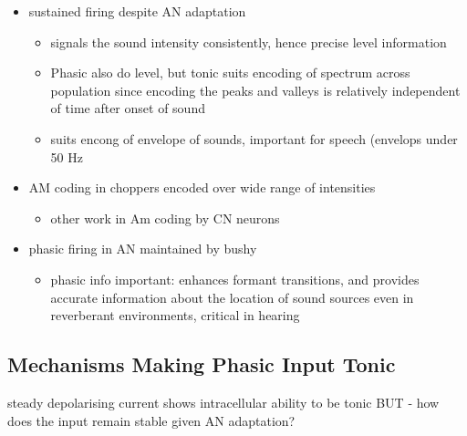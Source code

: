\begin{itemize}
\item sustained firing despite AN adaptation
\begin{itemize}
\item signals the sound intensity consistently, hence precise level information
\item Phasic also do level, but tonic suits encoding of spectrum across population since encoding the peaks and valleys is relatively independent of time after onset of sound \citep{BlackburnSachs:1990,May:2003,MayPrellEtAl:1998,MaySachs:1998}
\item suits encong of envelope of sounds, important for speech (envelops under 50 Hz \citep{ShannonZengEtAl:1995}
\end{itemize}
\item AM coding in choppers encoded over wide range of intensities \citep{RhodeGreenberg:1994,FrisinaSmithEtAl:1990}
\begin{itemize}
\item other work in Am coding by CN neurons  \citep{Moller:1972,Moller:1974a,Moller:1974,MooreCashin:1974,Frisina:1984,PalmerWinterEtAl:1986,KimRhodeEtAl:1986,WinterPalmer:1990a,Palmer:1990,PalmerWinter:1992,FrisinaSmithEtAl:1990a,Frisina:1983,GorodetskaiaBibikov:1985,RhodeGreenberg:1994,ShofnerSheftEtAl:1996,FrisinaKarcichEtAl:1996,DAngeloSterbingEtAl:2003,Aggarwal:2003}
\end{itemize}
\item phasic firing in AN maintained by bushy
\begin{itemize}
\item phasic info important: enhances formant transitions, and provides accurate information about the location of sound sources even in reverberant environments, critical in hearing \cite{DelgutteKiang:1984,DelgutteKiang:1984a,DelgutteKiang:1984b,DelgutteKiang:1984c,DelgutteKiang:1984d,DavoreIhlefeldEtAl:2009}
\end{itemize}
\end{itemize}
\subsection{Mechanisms Making Phasic Input Tonic}
\label{sec-1_3}


steady depolarising current shows intracellular ability to be tonic \cite{Oertel:1983,OertelWuEtAl:1988} BUT - how does the input remain stable given AN adaptation?


